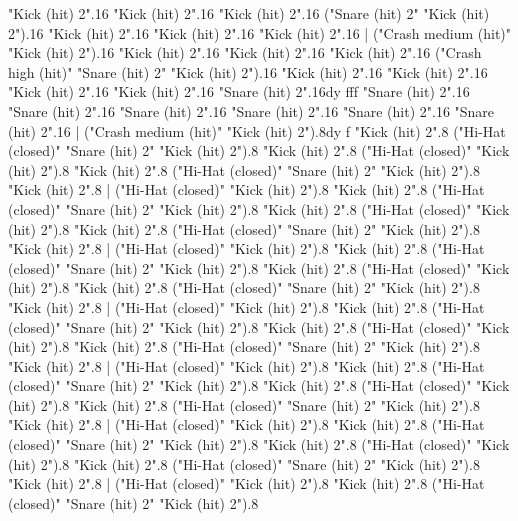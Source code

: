       "Kick (hit) 2".16
      "Kick (hit) 2".16
      "Kick (hit) 2".16
      ("Snare (hit) 2" "Kick (hit) 2").16
      "Kick (hit) 2".16
      "Kick (hit) 2".16
      "Kick (hit) 2".16
    |
      ("Crash medium (hit)" "Kick (hit) 2").16
      "Kick (hit) 2".16
      "Kick (hit) 2".16
      "Kick (hit) 2".16
      ("Crash high (hit)" "Snare (hit) 2" "Kick (hit) 2").16
      "Kick (hit) 2".16
      "Kick (hit) 2".16
      "Kick (hit) 2".16
      "Kick (hit) 2".16
      "Snare (hit) 2".16{dy fff}
      "Snare (hit) 2".16
      "Snare (hit) 2".16
      "Snare (hit) 2".16
      "Snare (hit) 2".16
      "Snare (hit) 2".16
      "Snare (hit) 2".16
    |
      ("Crash medium (hit)" "Kick (hit) 2").8{dy f}
      "Kick (hit) 2".8
      ("Hi-Hat (closed)" "Snare (hit) 2" "Kick (hit) 2").8
      "Kick (hit) 2".8
      ("Hi-Hat (closed)" "Kick (hit) 2").8
      "Kick (hit) 2".8
      ("Hi-Hat (closed)" "Snare (hit) 2" "Kick (hit) 2").8
      "Kick (hit) 2".8
    |
      ("Hi-Hat (closed)" "Kick (hit) 2").8
      "Kick (hit) 2".8
      ("Hi-Hat (closed)" "Snare (hit) 2" "Kick (hit) 2").8
      "Kick (hit) 2".8
      ("Hi-Hat (closed)" "Kick (hit) 2").8
      "Kick (hit) 2".8
      ("Hi-Hat (closed)" "Snare (hit) 2" "Kick (hit) 2").8
      "Kick (hit) 2".8
    |
      ("Hi-Hat (closed)" "Kick (hit) 2").8
      "Kick (hit) 2".8
      ("Hi-Hat (closed)" "Snare (hit) 2" "Kick (hit) 2").8
      "Kick (hit) 2".8
      ("Hi-Hat (closed)" "Kick (hit) 2").8
      "Kick (hit) 2".8
      ("Hi-Hat (closed)" "Snare (hit) 2" "Kick (hit) 2").8
      "Kick (hit) 2".8
    |
      ("Hi-Hat (closed)" "Kick (hit) 2").8
      "Kick (hit) 2".8
      ("Hi-Hat (closed)" "Snare (hit) 2" "Kick (hit) 2").8
      "Kick (hit) 2".8
      ("Hi-Hat (closed)" "Kick (hit) 2").8
      "Kick (hit) 2".8
      ("Hi-Hat (closed)" "Snare (hit) 2" "Kick (hit) 2").8
      "Kick (hit) 2".8
    |
      ("Hi-Hat (closed)" "Kick (hit) 2").8
      "Kick (hit) 2".8
      ("Hi-Hat (closed)" "Snare (hit) 2" "Kick (hit) 2").8
      "Kick (hit) 2".8
      ("Hi-Hat (closed)" "Kick (hit) 2").8
      "Kick (hit) 2".8
      ("Hi-Hat (closed)" "Snare (hit) 2" "Kick (hit) 2").8
      "Kick (hit) 2".8
    |
      ("Hi-Hat (closed)" "Kick (hit) 2").8
      "Kick (hit) 2".8
      ("Hi-Hat (closed)" "Snare (hit) 2" "Kick (hit) 2").8
      "Kick (hit) 2".8
      ("Hi-Hat (closed)" "Kick (hit) 2").8
      "Kick (hit) 2".8
      ("Hi-Hat (closed)" "Snare (hit) 2" "Kick (hit) 2").8
      "Kick (hit) 2".8
    |
      ("Hi-Hat (closed)" "Kick (hit) 2").8
      "Kick (hit) 2".8
      ("Hi-Hat (closed)" "Snare (hit) 2" "Kick (hit) 2").8
